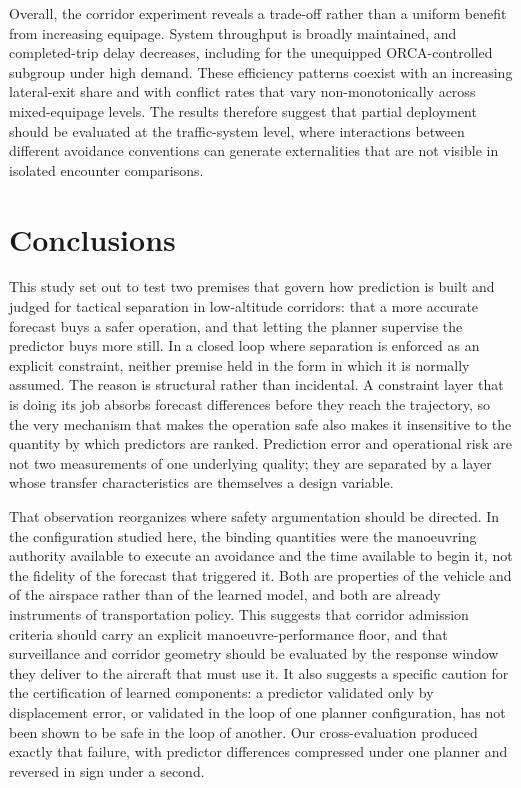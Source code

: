 \documentclass[11pt]{article}
\theoremstyle{plain}
\theoremstyle{definition}
\begin{document}
Overall, the corridor experiment reveals a trade-off rather than a
uniform benefit from increasing equipage. System throughput is broadly
maintained, and completed-trip delay decreases, including for the
unequipped ORCA-controlled subgroup under high demand. These efficiency
patterns coexist with an increasing lateral-exit share and with
conflict rates that vary non-monotonically across mixed-equipage
levels. The results therefore suggest that partial deployment should
be evaluated at the traffic-system level, where interactions between
different avoidance conventions can generate externalities that are
not visible in isolated encounter comparisons.





\FloatBarrier
\section{Conclusions}
\label{sec:conclusions}

This study set out to test two premises that govern how prediction is
built and judged for tactical separation in low-altitude corridors:
that a more accurate forecast buys a safer operation, and that letting
the planner supervise the predictor buys more still. In a closed loop
where separation is enforced as an explicit constraint, neither premise
held in the form in which it is normally assumed. The reason is
structural rather than incidental. A constraint layer that is doing its
job absorbs forecast differences before they reach the trajectory, so
the very mechanism that makes the operation safe also makes it
insensitive to the quantity by which predictors are ranked. Prediction
error and operational risk are not two measurements of one underlying
quality; they are separated by a layer whose transfer characteristics
are themselves a design variable.

That observation reorganizes where safety argumentation should be
directed. In the configuration studied here, the binding quantities
were the manoeuvring authority available to execute an avoidance and
the time available to begin it, not the fidelity of the forecast that
triggered it. Both are properties of the vehicle and of the airspace
rather than of the learned model, and both are already instruments of
transportation policy. This suggests that corridor admission criteria
should carry an explicit manoeuvre-performance floor, and that
surveillance and corridor geometry should be evaluated by the response
window they deliver to the aircraft that must use it. It also suggests
a specific caution for the certification of learned components: a
predictor validated only by displacement error, or validated in the
loop of one planner configuration, has not been shown to be safe in
the loop of another. Our cross-evaluation produced exactly that
failure, with predictor differences compressed under one planner and
reversed in sign under a second.
\end{document}
